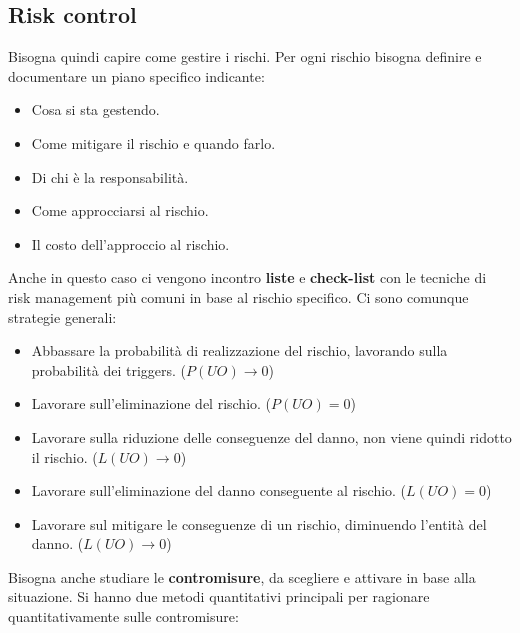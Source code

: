\subsection{Risk control}
Bisogna quindi capire come gestire i rischi. Per ogni rischio bisogna definire e
documentare un piano specifico indicante:
\begin{itemize}
    \item Cosa si sta gestendo.
    \item Come mitigare il rischio e quando farlo.
    \item Di chi è la responsabilità.
    \item Come approcciarsi al rischio.
    \item Il costo dell'approccio al rischio.
\end{itemize}
Anche in questo caso ci vengono incontro \textbf{liste} e \textbf{check-list} con le tecniche di risk
management più comuni in base al rischio specifico. Ci sono comunque strategie generali:
\begin{itemize}
    \item Abbassare la probabilità di realizzazione del rischio, lavorando sulla probabilità 
          dei triggers. ($P(UO) \to 0$)
    \item Lavorare sull'eliminazione del rischio. ($P(UO) = 0$)
    \item Lavorare sulla riduzione delle conseguenze del danno,
          non viene quindi ridotto il rischio. ($L(UO) \to 0$)
    \item Lavorare sull'eliminazione del danno conseguente al rischio. ($L(UO) = 0$)
    \item Lavorare sul mitigare le conseguenze di un rischio, diminuendo l'entità
          del danno. ($L(UO) \to 0$)
\end{itemize}
Bisogna anche studiare le \textbf{contromisure}, da scegliere e attivare in base
alla situazione. Si hanno due metodi quantitativi principali per ragionare
quantitativamente sulle contromisure:
